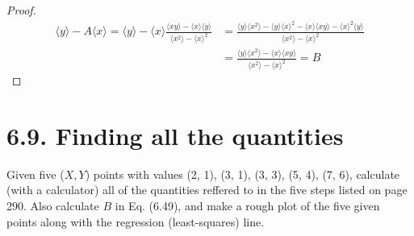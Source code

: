 \vspace{1em}

\begin{proof}
    \begin{align*}\tag{6.49}
        \langle y \rangle - A \langle x \rangle 
        = \langle y \rangle - \langle x \rangle 
        \frac{\langle xy \rangle - \langle x \rangle \langle y \rangle}{\langle x^2 \rangle - \langle x \rangle^2}
        &= \frac{\langle y \rangle \langle x^2 \rangle - \langle y \rangle \langle x \rangle^2
            - \langle x \rangle \langle xy \rangle - \langle x \rangle^2 \langle y \rangle}
            {\langle x^2 \rangle - \langle x \rangle^2} \\
        &= \frac{\langle y \rangle \langle x^2 \rangle - \langle x \rangle \langle xy \rangle}
            {\langle x^2 \rangle - \langle x \rangle^2}
        = B
    \end{align*}
\end{proof}

\section*{6.9. Finding all the quantities}
Given five ($X, Y$) points with values (2, 1), (3, 1), (3, 3),
(5, 4), (7, 6), calculate (with a calculator) all of the quantities
reffered to in the five steps listed on page 290. Also calculate
$B$ in Eq. (6.49), and make a rough plot of the five given points
along with the regression (least-squares) line.

\vspace{1em}

